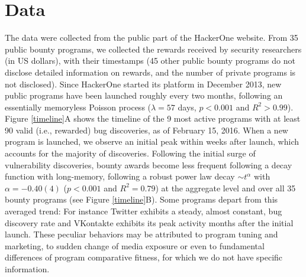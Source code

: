 \section{Data}
\label{sec:data}
The data were collected from the public part of the HackerOne website. From 35 public bounty programs, we collected the rewards received by security researchers (in US dollars), with their timestamps (45 other public bounty programs do not disclose detailed information on rewards, and the number of private programs is not disclosed). Since HackerOne started its platform in December 2013, new public programs have been launched roughly every two months, following an essentially memoryless Poisson process ($\lambda = 57$ days, $p < 0.001$ and $R^2 > 0.99$). Figure \ref{timeline}A shows the timeline of the 9 most active programs with at least 90 valid (i.e., rewarded) bug discoveries, as of February 15, 2016. When a new program is launched, we observe an initial peak within weeks after launch, which accounts for the majority of discoveries. Following the initial surge of vulnerability discoveries, bounty awards become less frequent following a decay function with long-memory, following a robust power law decay $\sim t^{\alpha}$ with $\alpha = -0.40(4)$ ($p < 0.001$ and $R^2 = 0.79$) at the aggregate level and over all 35 bounty programs (see Figure \ref{timeline}B). Some programs depart from this averaged trend: For instance Twitter exhibits a steady, almost constant, bug discovery rate and VKontakte exhibits its peak activity months after the initial launch. These peculiar behaviors may be attributed to program tuning and marketing, to sudden change of media exposure or even to fundamental differences of program comparative fitness, for which we do not have specific information.\\

